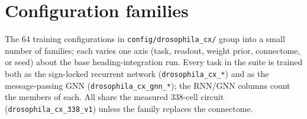 \documentclass[11pt]{article}
\begin{document}
\clearpage

\section{Configuration families}
\label{app:config_families}

The 64 training configurations in \texttt{config/drosophila\_cx/} group
into a small number of families; each varies one axis (task, readout,
weight prior, connectome, or seed) about the base heading-integration run.
Every task in the suite is trained both as the sign-locked recurrent network
(\texttt{drosophila\_cx\_*}) and as the message-passing GNN
(\texttt{drosophila\_cx\_gnn\_*}); the RNN/GNN columns count the members of
each. All share the measured 338-cell circuit
(\texttt{drosophila\_cx\_338\_v1}) unless the family replaces the connectome.
\end{document}

